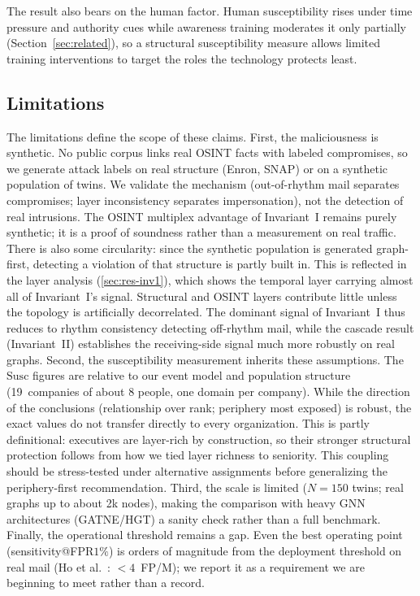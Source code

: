 The result also bears on the human factor. Human susceptibility rises under time pressure and authority cues
while awareness training moderates it only partially (Section~\ref{sec:related}), so a structural susceptibility
measure allows limited training interventions to target the roles the technology protects least.

\subsection{Limitations}
The limitations define the scope of these claims. First, the maliciousness is synthetic. No public corpus
links real OSINT facts with labeled compromises, so we generate attack labels on real structure (Enron, SNAP) or
on a synthetic population of twins. We validate the mechanism (out-of-rhythm mail separates
compromises; layer inconsistency separates impersonation), not the detection of real intrusions. The OSINT
multiplex advantage of Invariant~I remains purely synthetic; it is a proof of soundness rather than a
measurement on real traffic. There is also some circularity: since the synthetic population is generated graph-first,
detecting a violation of that structure is partly built in. This is reflected in the layer analysis
(\ref{sec:res-inv1}), which shows the temporal layer carrying almost all of Invariant~I's signal. Structural
and OSINT layers contribute little unless the topology is artificially decorrelated. The dominant signal of
Invariant~I thus reduces to rhythm consistency detecting off-rhythm mail, while the cascade result
(Invariant~II) establishes the receiving-side signal much more robustly on real graphs. Second, the
susceptibility measurement inherits these assumptions. The $\mathrm{Susc}$ figures are relative to our event
model and population structure (19~companies of about 8 people, one domain per company). While the direction of the
conclusions (relationship over rank; periphery most exposed) is robust, the exact values do not
transfer directly to every organization. This is partly definitional: executives are layer-rich by
construction, so their stronger structural protection follows from how we tied layer richness to
seniority. This coupling should be stress-tested under alternative assignments before generalizing the periphery-first
recommendation. Third, the scale is limited ($N{=}150$ twins; real graphs up to about 2k
nodes), making the comparison with heavy GNN architectures (GATNE/HGT) a sanity check rather than a full benchmark.
Finally, the operational threshold remains a gap. Even the best operating point (sensitivity@FPR$1\%$) is orders of
magnitude from the deployment threshold on real mail (Ho et al.\ \citep{ho2019detecting}: $<\!4$~FP/M); we report
it as a requirement we are beginning to meet rather than a record.

